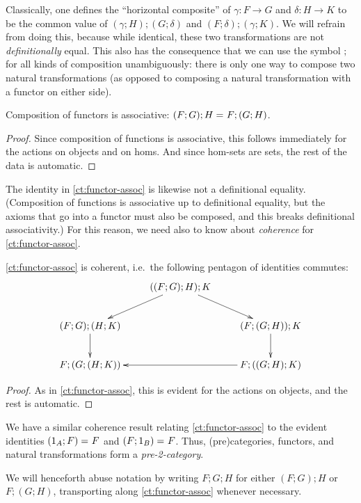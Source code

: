 Classically, one defines the ``horizontal composite'' of $\gamma:F\to G$ and $\delta:H\to K$ to be the common value of $(\gamma;H);(G;\delta)$ and $(F;\delta);(\gamma;K)$.  We will refrain from doing this, because while identical, these two transformations are not \emph{definitionally} equal.  This also has the consequence that we can use the symbol $;$ for all kinds of composition unambiguously: there is only one way to compose two natural transformations (as opposed to composing a natural transformation with a functor on either side).

\begin{lem}\label{ct:functor-assoc}
  Composition of functors is associative: $(F;G);H =_{} F;(G;H)$.
\end{lem}
\begin{proof}
  Since composition of functions is associative, this follows immediately for the actions on objects and on homs.  And since hom-sets are sets, the rest of the data is automatic.
\end{proof}

The identity in \autoref{ct:functor-assoc} is likewise not a definitional equality.  (Composition of functions is associative up to definitional equality, but the axioms that go into a functor must also be composed, and this breaks definitional associativity.)  For this reason, we need also to know about \emph{coherence} for \autoref{ct:functor-assoc}.

\begin{lem}\label{ct:pentagon}
  \autoref{ct:functor-assoc} is coherent, i.e.\ the following pentagon of identities commutes:
  \[ \xymatrix{ & ((F;G);H);K \ar[dl] \ar[dr]\\
    (F;G);(H;K) \ar[d] && (F;(G;H));K \ar[d]\\
    F;(G;(H;K)) && F;((G;H);K) \ar[ll] }
  \]
\end{lem}
\begin{proof}
  As in \autoref{ct:functor-assoc}, this is evident for the actions on objects, and the rest is automatic.
\end{proof}

We have a similar coherence result relating \autoref{ct:functor-assoc} to the evident identities $(1_A;F) =_{} F$ and $(F;1_B) =_{} F$.  Thus, (pre)categories, functors, and natural transformations form a \emph{pre-2-category}.

We will henceforth abuse notation by writing $F;G;H$ for either $(F;G);H$ or $F;(G;H)$, transporting along \autoref{ct:functor-assoc} whenever necessary.


